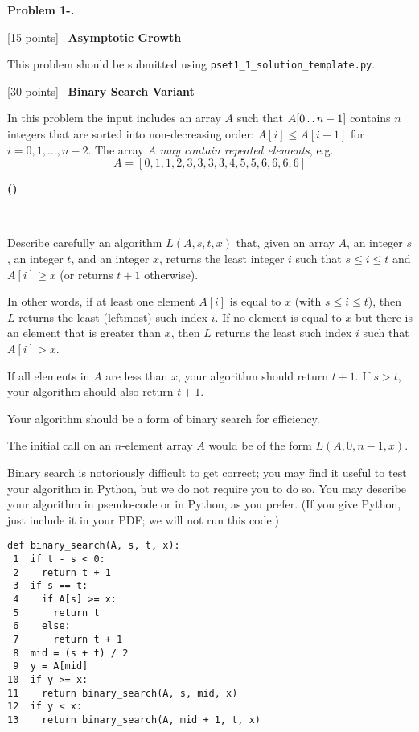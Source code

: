 \documentclass[12pt,twoside]{article}
\makeatletter
\newcommand{\points}[1]{[#1 points]\ }
\newcommand{\twodots}{\mathinner{\ldotp\ldotp}}
\newcounter{problemnum}
\newcommand{\theproblem}{Problem \theproblemsetnum-\arabic{problemnum}}
\newenvironment{problems}{
        \begin{list}{{\bf \theproblem. \hspace*{0.5em}}}
        {\setlength{\leftmargin}{0em}
         \setlength{\rightmargin}{0em}
         \setlength{\labelwidth}{0em}
         \setlength{\labelsep}{0em}
         \usecounter{problemnum}}}{\end{list}}
\newcommand{\problem}[1][{}]{\item \let\@currentlabel=\theproblem \textbf{#1}}
\newcounter{problempartnum}[problemnum]
\newenvironment{problemparts}{
        \begin{list}{{\bf (\alph{problempartnum})}}
        {\setlength{\leftmargin}{2.5em}
         \setlength{\rightmargin}{2.5em}
         \setlength{\labelsep}{0.5em}}}{\end{list}}
\newcommand{\problempart}{\addtocounter{problempartnum}{1}\item}
\newcommand{\theproblemsetnum}{1}
\makeatother
\begin{document}
\begin{problems}

\problem \points{15} \textbf{Asymptotic Growth}

This problem should be submitted using {\tt pset1\_1\_solution\_template.py}.


\problem \points{30} \textbf{Binary Search Variant}

In this problem the input includes an array $A$ such that
$A[0 \twodots n-1]$ contains $n$ integers that are
sorted into non-decreasing order: $A[i]\le A[i+1]$ for
$i=0,1,\ldots,n-2$.  The array $A$ \emph{may contain repeated
elements}, e.g.
\[
    A = [ 0, 1, 1, 2, 3, 3, 3, 3, 4, 5, 5, 6, 6, 6, 6]
\]

\begin{problemparts}

\problempart \points{10}

Describe carefully an algorithm $L(A,s,t,x)$ that, given an array $A$, an
integer $s$, an integer $t$, and an integer $x$, returns the least
integer $i$ such that $s \le i \le t$ and $A[i]\ge x$ (or returns $t+1$
otherwise).

In other words, if at least one element $A[i]$ is equal to $x$ (with $s\le i\le t$), then
$L$ returns the least (leftmost) such index $i$.  If no element is
equal to $x$ but there is an element that is greater than $x$, then $L$
returns the least such index $i$ such that $A[i]>x$.

If all elements in $A$ are less than $x$, your algorithm should return
$t+1$.  If $s>t$, your algorithm should also return $t+1$.

Your algorithm should be a form of binary search for efficiency.

The initial call on an $n$-element array $A$ would be of the form $L(A,0,n-1,x)$.

Binary search is notoriously difficult to get correct; you may find it
useful to test your algorithm in Python, but we do not require you to
do so.  You may describe your algorithm in pseudo-code or in Python, as you
prefer.  (If you give Python, just include it in your PDF; we will not run
this code.)

\begin{Verbatim}[frame=single]
def binary_search(A, s, t, x):
 1  if t - s < 0:
 2    return t + 1
 3  if s == t:
 4    if A[s] >= x:
 5      return t
 6    else:
 7      return t + 1
 8  mid = (s + t) / 2
 9  y = A[mid]
10  if y >= x:
11    return binary_search(A, s, mid, x)
12  if y < x:
13    return binary_search(A, mid + 1, t, x)
\end{Verbatim}


\end{problemparts}
\end{problems}
\end{document}

